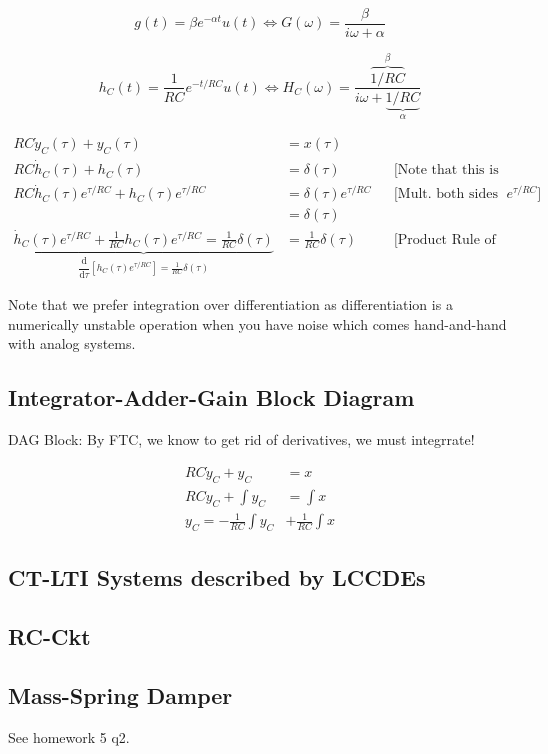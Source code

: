 \[
    g(t) = \beta e^{-\alpha t} u(t) \iff G(\omega) = \frac{\beta}{i\omega + \alpha}
\]

\[
    h_C(t) = \frac1{RC} e^{-t/{RC}} u(t)
    \iff
    H_C(\omega) = \frac{\overbrace{1/{RC}}^\beta}{i\omega + \underbrace{1/{RC}}_{\alpha}}
\]

\hrulefill

\begin{align*}
    RC\Dot{y}_C(\tau) + y_C(\tau) &= x(\tau)
    \\
    RC \Dot{h}_C(\tau) + {h}_C(\tau)
    &= \delta(\tau)
    &&\text{[Note that this is the Dirac Delta]}
    \\
    RC \Dot{h}_C(\tau) e^{\tau/{RC}} + {h}_C(\tau) e^{\tau/{RC}}
    &= \delta(\tau) e^{\tau/{RC}}
    &&\text{[Mult. both sides by non-0 func $e^{\tau/{RC}}$]}
    \\
    &= \delta(\tau)
    \\
    \underbrace{\Dot{h}_C(\tau) e^{\tau/{RC}} + \frac1{RC} {h}_C(\tau) e^{\tau/{RC}}
    = \frac1{RC} \delta(\tau)}_{\dfrac{\mathrm d}{\mathrm d\tau}[h_C(\tau) e^{\tau/{RC}}]=\frac1{RC}\delta(\tau)}
    &= \frac1{RC}\delta(\tau)
    &&\text{[Product Rule of Differentiation]}
\end{align*}

\begin{shaded}
Note that we prefer integration over differentiation as differentiation is a numerically unstable operation when you have noise which comes hand-and-hand with analog systems.
\end{shaded}

\subsection{Integrator-Adder-Gain Block Diagram}
DAG Block: By FTC, we know to get rid of derivatives, we must integrrate!

\begin{align*}
    RC\Dot{y}_C + y_C &= x
    \\
    RC{y}_C + \int y_C &= \int x
    \\
    {y}_C = - \frac1{RC}\int y_C &+ \frac1{RC}\int x
\end{align*}

\subsection{CT-LTI Systems described by LCCDEs}
\subsection{RC-Ckt}
\subsection{Mass-Spring Damper}
See homework 5 q2.

